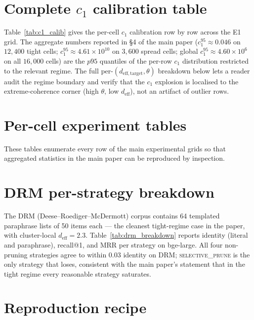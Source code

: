 \documentclass[11pt]{article}
\theoremstyle{definition}
\theoremstyle{remark}
\newcommand{\deff}{d_{\mathrm{eff}}}
\begin{document}
\section{Complete $c_1$ calibration table}
\label{sec:supp:c1}

Table~\ref{tab:c1_calib} gives the per-cell $c_1$ calibration row by
row across the E1 grid. The aggregate numbers reported in \S4 of the
main paper ($c_1^{95} \approx 0.046$ on $12{,}400$ tight cells;
$c_1^{95} \approx 4.61 \times 10^{10}$ on $3{,}600$ spread cells;
global $c_1^{95} \approx 4.60 \times 10^{6}$ on all $16{,}000$ cells)
are the $p95$ quantiles of the per-row $c_1$ distribution restricted to
the relevant regime. The full per-$(d_{\mathrm{eff,target}}, \theta)$
breakdown below lets a reader audit the regime boundary and verify
that the $c_1$ explosion is localised to the extreme-coherence corner
(high $\theta$, low $\deff$), not an artifact of outlier rows.



\section{Per-cell experiment tables}
\label{sec:supp:percell}

These tables enumerate every row of the main experimental grids so
that aggregated statistics in the main paper can be reproduced by
inspection.





\section{DRM per-strategy breakdown}
\label{sec:supp:drm}

The DRM (Deese--Roediger--McDermott) corpus contains 64 templated
paraphrase lists of 50 items each --- the cleanest tight-regime case
in the paper, with cluster-local $\deff = 2.3$. Table~\ref{tab:drm_breakdown}
reports identity (literal and paraphrase), recall@1, and MRR per
strategy on bge-large. All four non-pruning strategies agree to within
$0.03$ identity on DRM; \textsc{selective\_prune} is the only
strategy that loses, consistent with the main paper's statement that
in the tight regime every reasonable strategy saturates.



\section{Reproduction recipe}
\label{sec:supp:repro}
\end{document}
